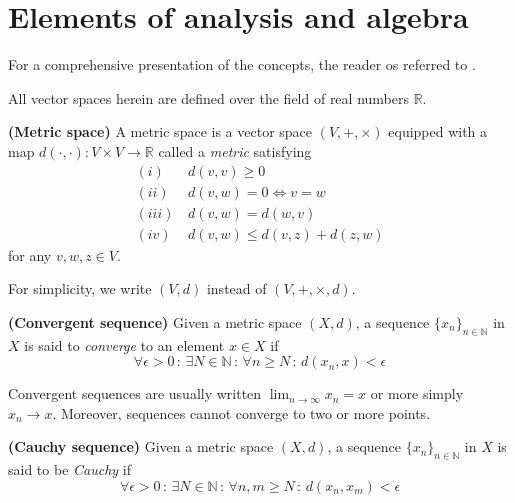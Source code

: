 \appendix

\chapter{Elements of analysis and algebra}
\label{app.elements_analysis_algebra}

For a comprehensive presentation of the concepts, the reader os referred to \cite{searcoid2002elements,pugh2002real}. 

All vector spaces herein are defined over the field of real numbers $\mathbb{R}$.

\begin{definition}
	\textbf{(Metric space)}
	A metric space is a vector space $(V,+,\times)$ equipped with a map $d(\cdot,\cdot):V \times V \rightarrow \mathbb{R}$ called a \textit{metric} satisfying
	\begin{align}
		(i) \, &d(v,v) \geq 0 \\
		(ii) \, &d(v,w) = 0 \Leftrightarrow v = w\\
		(iii) \, &d(v,w) = d(w,v) \\
		(iv) \, &d(v,w) \leq d(v,z) + d(z,w)
	\end{align}
	for any $v,w,z \in V$.
\end{definition}

For simplicity, we write $(V,d)$ instead of $(V,+,\times,d)$.

\begin{definition}
	\textbf{(Convergent sequence)}
	Given a metric space $(X,d)$, a sequence $\{x_n\}_{n\in\mathbb{N}}$ in $X$ is said to \textit{converge} to an element $x \in X$ if
	\begin{equation}
		\forall \epsilon > 0 \, : \, \exists N \in \mathbb{N} \, : \,  \forall n \geq N \, : \, d(x_n, x) < \epsilon
	\end{equation}
\end{definition}

Convergent sequences are usually written $\lim_{n \rightarrow \infty} x_n = x$ or more simply $x_n \rightarrow x$. Moreover, sequences cannot converge to two or more points.

\begin{definition}
	\textbf{(Cauchy sequence)}
	Given a metric space $(X,d)$, a sequence $\{x_n\}_{n\in\mathbb{N}}$ in $X$ is said to be \textit{Cauchy} if
	\begin{equation}
		\forall \epsilon > 0 \, : \, \exists N \in \mathbb{N} \, : \,  \forall n,m \geq N \, : \, d(x_n, x_m) < \epsilon
	\end{equation}
\end{definition}

